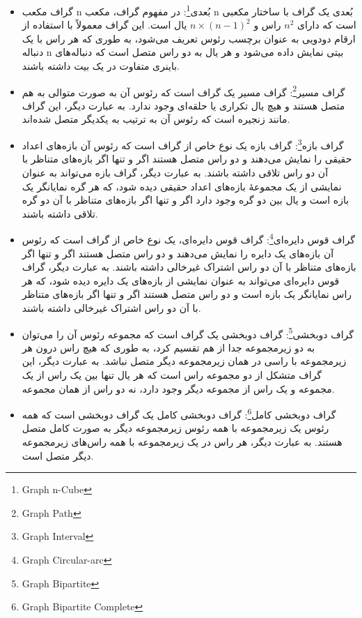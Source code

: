 \documentclass[a4paper,10pt]{article}
\begin{document}
\begin{itemize}
        \item گراف مکعب n بُعدی\footnote{\hspace{2pt}Graph n-Cube}: در مفهوم گراف، مکعب n بُعدی یک گراف با ساختار مکعبی است که دارای $n^2$ راس و $n \times (n-1)^2$ یال است. این گراف معمولاً با استفاده از ارقام دودویی به عنوان برچسب رئوس تعریف می‌شود، به طوری که هر راس با یک دنباله n بیتی نمایش داده می‌شود و هر یال به دو راس متصل است که دنباله‌های باینری متفاوت در یک بیت داشته باشند.
        
        \item گراف مسیر\footnote{\hspace{2pt}Graph Path}: گراف مسیر یک گراف است که رئوس آن به صورت متوالی به هم متصل هستند و هیچ یال تکراری یا حلقه‌ای وجود ندارد. به عبارت دیگر، این گراف مانند زنجیره است که رئوس آن به ترتیب به یکدیگر متصل شده‌اند.
        
        \item گراف بازه\footnote{\hspace{2pt}Graph Interval}: گراف بازه یک نوع خاص از گراف است که رئوس آن بازه‌های اعداد حقیقی را نمایش می‌دهند و دو راس متصل هستند اگر و تنها اگر بازه‌های متناظر با آن دو راس تلاقی داشته باشند. به عبارت دیگر، گراف بازه می‌تواند به عنوان نمایشی از یک مجموعهٔ بازه‌های اعداد حقیقی دیده شود، که هر گره نمایانگر یک بازه است و یال بین دو گره وجود دارد اگر و تنها اگر بازه‌های متناظر با آن دو گره تلاقی داشته باشند.
        
        \item گراف قوس دایره‌ای\footnote{\hspace{2pt}Graph Circular-arc}: گراف قوس دایره‌ای، یک نوع خاص از گراف است که رئوس آن بازه‌های یک دایره را نمایش می‌دهند و دو راس متصل هستند اگر و تنها اگر بازه‌های متناظر با آن دو راس اشتراک غیرخالی داشته باشند. به عبارت دیگر، گراف قوس دایره‌ای می‌تواند به عنوان نمایشی از بازه‌های یک دایره دیده شود، که هر راس نمایانگر یک بازه است و دو راس متصل هستند اگر و تنها اگر بازه‌های متناظر با آن دو راس اشتراک غیرخالی داشته باشند.
        
        \item گراف دوبخشی\footnote{\hspace{2pt}Graph Bipartite}: گراف دوبخشی یک گراف است که مجموعه رئوس آن را می‌توان به دو زیرمجموعه جدا از هم تقسیم کرد، به طوری که هیچ راس درون هر زیرمجموعه با راسی در همان زیرمجموعه دیگر متصل نباشد. به عبارت دیگر، این گراف متشکل از دو مجموعه راس است که هر یال تنها بین یک راس از یک مجموعه و یک راس از مجموعه دیگر وجود دارد، نه دو راس از همان مجموعه.

        \item گراف دوبخشی کامل\footnote{\hspace{2pt}Graph Bipartite Complete}: گراف دوبخشی کامل یک گراف دوبخشی است که همه رئوس یک زیرمجموعه با همه رئوس زیرمجموعه دیگر به صورت کامل متصل هستند. به عبارت دیگر، هر راس در یک زیرمجموعه با همه راس‌های زیرمجموعه دیگر متصل است.
        

\end{itemize}
\end{document}
